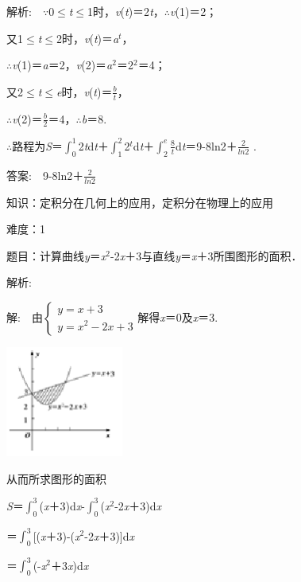 \documentclass{article} %
\begin{document}
 解析:　$\mathrm{\because}$0$\mathrm{\le}$\textit{t}$\mathrm{\le}$1时，\textit{v}(\textit{t})＝2\textit{t}，$\mathrm{\therefore}$\textit{v}(1)＝2；

又1$\mathrm{\le}$\textit{t}$\mathrm{\le}$2时，\textit{v}(\textit{t})＝\textit{a${}^{t}$}，

$\mathrm{\therefore}$\textit{v}(1)＝\textit{a}＝2，\textit{v}(2)＝\textit{a}${}^{2}$＝2${}^{2}$＝4；

又2$\mathrm{\le}$\textit{t}$\mathrm{\le}$\textit{e}时，\textit{v}(\textit{t})＝$\frac{b}{t}$，

$\mathrm{\therefore}$\textit{v}(2)＝$\frac{b}{2}$＝4，$\mathrm{\therefore}$\textit{b}＝8.

$\mathrm{\therefore}$路程为\textit{S}＝$\int_{0}^{1}$2\textit{t}d\textit{t}＋$\int_{1}^{2}$2\textit{${}^{t}$}d\textit{t}＋$\int_{2}^{e}\frac{8}{t}$d\textit{t}＝9-8ln2＋$\frac{2}{ln2}$ .

 答案:　9-8ln2＋$\frac{2}{ln2}$ 



 知识：定积分在几何上的应用，定积分在物理上的应用

 难度：1

 题目：计算曲线\textit{y}＝\textit{x}${}^{2}$-2\textit{x}＋3与直线\textit{y}＝\textit{x}＋3所围图形的面积．

 解析:

 解:　由$\left\{\begin{array}{r}y=x+3\\y=x^2-2x+3\end{array} \right.$解得\textit{x}＝0及\textit{x}＝3.

\includegraphics*[width=1.52in, height=1.43in, keepaspectratio=false]{image40}

从而所求图形的面积

\textit{S}＝$\int_{0}^{3}$(\textit{x}＋3)d\textit{x}-$\int_{0}^{3}$(\textit{x}${}^{2}$-2\textit{x}＋3)d\textit{x}

＝$\int_{0}^{3}$[(\textit{x}＋3)-(\textit{x}${}^{2}$-2\textit{x}＋3)]d\textit{x}

＝$\int_{0}^{3}$(-\textit{x}${}^{2}$＋3\textit{x})d\textit{x}
\end{document}
